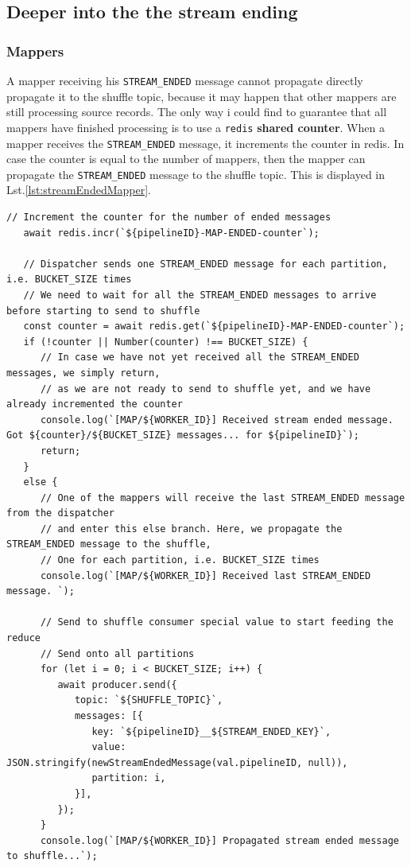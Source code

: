 \subsection{Deeper into the the stream ending}

\subsubsection{Mappers}
A mapper receiving his \lstinline|STREAM_ENDED| message cannot propagate directly propagate it to the shuffle topic, because it may happen that other mappers are still processing source records.
The only way i could find to guarantee that all mappers have finished processing is to use a \texttt{redis} \textbf{shared counter}.
When a mapper receives the \lstinline|STREAM_ENDED| message, it increments the counter in redis.
In case the counter is equal to the number of mappers, then the mapper can propagate the \lstinline|STREAM_ENDED| message to the shuffle topic.
This is displayed in Lst.\ref{lst:streamEndedMapper}.


\begin{lstlisting}[label={lst:streamEndedMapper}, caption={Handling the STREAM\_ENDED message in a mapper}]
   // Increment the counter for the number of ended messages
   await redis.incr(`${pipelineID}-MAP-ENDED-counter`);
   
   // Dispatcher sends one STREAM_ENDED message for each partition, i.e. BUCKET_SIZE times
   // We need to wait for all the STREAM_ENDED messages to arrive before starting to send to shuffle
   const counter = await redis.get(`${pipelineID}-MAP-ENDED-counter`);
   if (!counter || Number(counter) !== BUCKET_SIZE) {
      // In case we have not yet received all the STREAM_ENDED messages, we simply return,
      // as we are not ready to send to shuffle yet, and we have already incremented the counter
      console.log(`[MAP/${WORKER_ID}] Received stream ended message. Got ${counter}/${BUCKET_SIZE} messages... for ${pipelineID}`);
      return;
   }
   else {
      // One of the mappers will receive the last STREAM_ENDED message from the dispatcher
      // and enter this else branch. Here, we propagate the STREAM_ENDED message to the shuffle,
      // One for each partition, i.e. BUCKET_SIZE times
      console.log(`[MAP/${WORKER_ID}] Received last STREAM_ENDED message. `);
   
      // Send to shuffle consumer special value to start feeding the reduce
      // Send onto all partitions
      for (let i = 0; i < BUCKET_SIZE; i++) {
         await producer.send({
            topic: `${SHUFFLE_TOPIC}`,
            messages: [{
               key: `${pipelineID}__${STREAM_ENDED_KEY}`,
               value: JSON.stringify(newStreamEndedMessage(val.pipelineID, null)),
               partition: i,
            }],
         });
      }
      console.log(`[MAP/${WORKER_ID}] Propagated stream ended message to shuffle...`);
\end{lstlisting}


